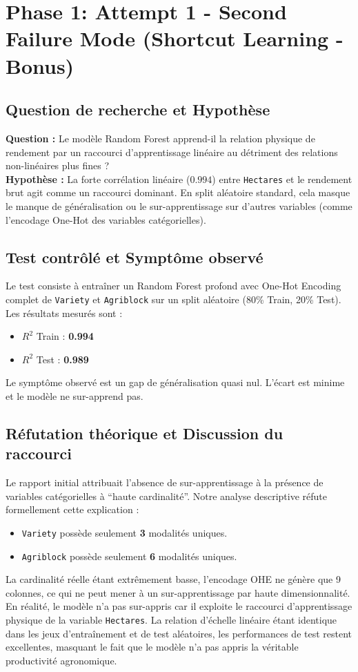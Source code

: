 \documentclass[11pt,a4paper]{article}
\begin{document}
\section{Phase 1: Attempt 1 - Second Failure Mode (Shortcut Learning - Bonus)}

\subsection{Question de recherche et Hypothèse}
\textbf{Question :} Le modèle Random Forest apprend-il la relation physique de rendement par un raccourci d'apprentissage linéaire au détriment des relations non-linéaires plus fines ? \\
\textbf{Hypothèse :} La forte corrélation linéaire ($0.994$) entre \texttt{Hectares} et le rendement brut agit comme un raccourci dominant. En split aléatoire standard, cela masque le manque de généralisation ou le sur-apprentissage sur d'autres variables (comme l'encodage One-Hot des variables catégorielles).

\subsection{Test contrôlé et Symptôme observé}
Le test consiste à entraîner un Random Forest profond avec One-Hot Encoding complet de \texttt{Variety} et \texttt{Agriblock} sur un split aléatoire (80\% Train, 20\% Test). Les résultats mesurés sont :
\begin{itemize}
    \item $R^2$ Train : \textbf{0.994}
    \item $R^2$ Test : \textbf{0.989}
\end{itemize}
Le symptôme observé est un gap de généralisation quasi nul. L'écart est minime et le modèle ne sur-apprend pas.

\subsection{Réfutation théorique et Discussion du raccourci}
Le rapport initial attribuait l'absence de sur-apprentissage à la présence de variables catégorielles à ``haute cardinalité''. Notre analyse descriptive réfute formellement cette explication :
\begin{itemize}
    \item \texttt{Variety} possède seulement \textbf{3} modalités uniques.
    \item \texttt{Agriblock} possède seulement \textbf{6} modalités uniques.
\end{itemize}
La cardinalité réelle étant extrêmement basse, l'encodage OHE ne génère que 9 colonnes, ce qui ne peut mener à un sur-apprentissage par haute dimensionnalité.
En réalité, le modèle n'a pas sur-appris car il exploite le raccourci d'apprentissage physique de la variable \texttt{Hectares}. La relation d'échelle linéaire étant identique dans les jeux d'entraînement et de test aléatoires, les performances de test restent excellentes, masquant le fait que le modèle n'a pas appris la véritable productivité agronomique.
\end{document}

